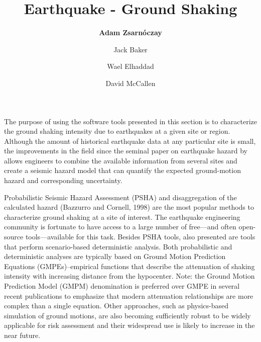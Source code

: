 %
%
%

\title{Earthquake - Ground Shaking}
\author{
    \textbf{Adam Zsarnóczay} 
    \and Jack Baker 
    \and Wael Elhaddad
    \and David McCallen}
\tocauthor{}
%
%
\maketitle

The purpose of using the software tools presented in this section is to characterize the ground shaking intensity due to earthquakes at a given site or region. Although the amount of historical earthquake data at any particular site is small, the improvements in the field since the seminal paper on earthquake hazard by \cite{cornell1968engineering} allows engineers to combine the available information from several sites and create a seismic hazard model that can quantify the expected ground-motion hazard and corresponding uncertainty. 

Probabilistic Seismic Hazard Assessment (PSHA) and disaggregation of the calculated hazard (Bazzurro and Cornell, 1998) are the most popular methods to characterize ground shaking at a site of interest. The earthquake engineering community is fortunate to have access to a large number of free—and often open-source tools—available for this task. Besides PSHA tools, also presented are tools that perform scenario-based deterministic analysis. Both probabilistic and deterministic analyses are typically based on Ground Motion Prediction Equations (GMPEs)–empirical functions that describe the attenuation of shaking intensity with increasing distance from the hypocenter. Note: the Ground Motion Prediction Model (GMPM) denomination is preferred over GMPE in several recent publications to emphasize that modern attenuation relationships are more complex than a single equation. Other approaches, such as physics-based simulation of ground motions, are also becoming sufficiently robust to be widely applicable for risk assessment and their widespread use is likely to increase in the near future. 

